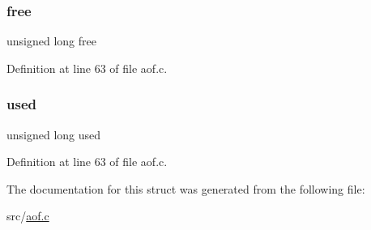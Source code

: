 \subsubsection{\texorpdfstring{free}{free}}
{\footnotesize\ttfamily unsigned long free}



Definition at line 63 of file aof.\+c.

\mbox{\label{structaofrwblock_abeece48b2d7c09bffa9101df617478d0}} 
\subsubsection{\texorpdfstring{used}{used}}
{\footnotesize\ttfamily unsigned long used}



Definition at line 63 of file aof.\+c.



The documentation for this struct was generated from the following file\+:\begin{DoxyCompactItemize}
\item 
src/\hyperlink{aof_8c}{aof.\+c}\end{DoxyCompactItemize}
